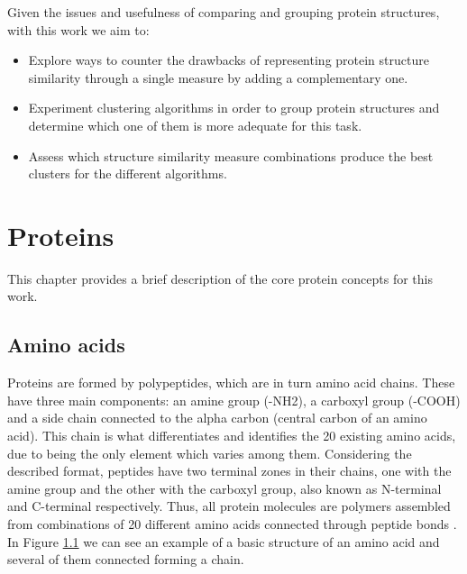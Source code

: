Given the issues and usefulness of comparing and grouping protein structures, with this work we aim to:
\begin{itemize}
	\item Explore ways to counter the drawbacks of representing protein structure similarity through a single measure by adding a complementary one.
	\item Experiment clustering algorithms in order to group protein structures and determine which one of them is more adequate for this task.
	\item Assess which structure similarity measure combinations produce the best clusters for the different algorithms.
\end{itemize}
	
\chapter{Proteins}	

This chapter provides a brief description of the core protein concepts for this work.

\section{Amino acids}
Proteins are formed by polypeptides, which are in turn amino acid chains. These have three main components: an amine group (-NH2), a carboxyl group (-COOH) and a side chain connected to the alpha carbon (central carbon of an amino acid). This chain is what differentiates and identifies the 20 existing amino acids, due to being the only element which varies among them. Considering the described format, peptides have two terminal zones in their chains, one with the amine group and the other with the carboxyl group, also known as N-terminal and C-terminal respectively. Thus, all protein molecules are polymers assembled from combinations of 20 different amino acids connected through peptide bonds \cite{branden1999introduction}. In Figure \ref{fig:aminoacid} we can see an example of a basic structure of an amino acid and several of them connected forming a chain.

\begin{figure}[htbp]
	\centering
	\caption{}
	\label{fig:aminoacid}
\end{figure}

